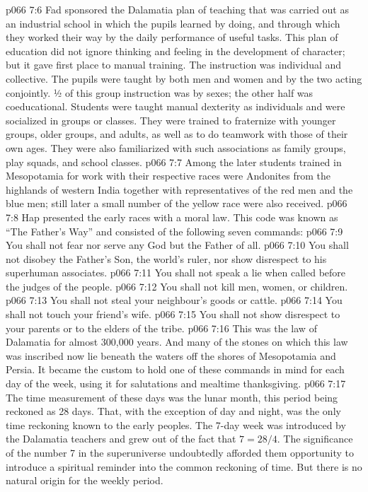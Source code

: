 \vs p066 7:6 \pc Fad sponsored the Dalamatia plan of teaching that was carried out as an industrial school in which the pupils learned by doing, and through which they worked their way by the daily performance of useful tasks. This plan of education did not ignore thinking and feeling in the development of character; but it gave first place to manual training. The instruction was individual and collective. The pupils were taught by both men and women and by the two acting conjointly. ½ of this group instruction was by sexes; the other half was coeducational. Students were taught manual dexterity as individuals and were socialized in groups or classes. They were trained to fraternize with younger groups, older groups, and adults, as well as to do teamwork with those of their own ages. They were also familiarized with such associations as family groups, play squads, and school classes.
\vs p066 7:7 Among the later students trained in Mesopotamia for work with their respective races were Andonites from the highlands of western India together with representatives of the red men and the blue men; still later a small number of the yellow race were also received.
\vs p066 7:8 \pc Hap presented the early races with a moral law. This code was known as “The Father’s Way” and consisted of the following seven commands:
\vs p066 7:9 \bibnobreakspace You shall not fear nor serve any God but the Father of all.
\vs p066 7:10 \bibnobreakspace You shall not disobey the Father’s Son, the world’s ruler, nor show disrespect to his superhuman associates.
\vs p066 7:11 \bibnobreakspace You shall not speak a lie when called before the judges of the people.
\vs p066 7:12 \bibnobreakspace You shall not kill men, women, or children.
\vs p066 7:13 \bibnobreakspace You shall not steal your neighbour’s goods or cattle.
\vs p066 7:14 \bibnobreakspace You shall not touch your friend’s wife.
\vs p066 7:15 \bibnobreakspace You shall not show disrespect to your parents or to the elders of the tribe.
\vs p066 7:16 \pc This was the law of Dalamatia for almost 300,000 years. And many of the stones on which this law was inscribed now lie beneath the waters off the shores of Mesopotamia and Persia. It became the custom to hold one of these commands in mind for each day of the week, using it for salutations and mealtime thanksgiving.
\vs p066 7:17 \pc The time measurement of these days was the lunar month, this period being reckoned as 28 days. That, with the exception of day and night, was the only time reckoning known to the early peoples. The 7\hyp{}day week was introduced by the Dalamatia teachers and grew out of the fact that $7 = 28/4$. The significance of the number 7 in the superuniverse undoubtedly afforded them opportunity to introduce a spiritual reminder into the common reckoning of time. But there is no natural origin for the weekly period.
